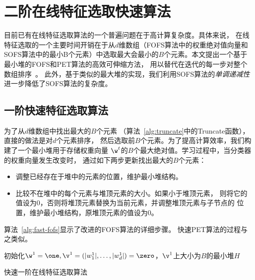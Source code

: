 \section{二阶在线特征选取快速算法}
目前已有在线特征选取算法的一个普遍问题在于高计算复杂度。具体来说，
在线特征选取的一个主要时间开销在于从$d$维数组（FOFS算法中的权重绝对值向量和
SOFS算法中的最小B个元素）中选取最大会最小的$B$个元素。本文提出一个基于
最小堆的FOFS和PET算法的高效可伸缩方法，
用以替代在迭代的每一步对整个数组排序~\cite{wang2014online}。
此外，基于类似的最大堆的实现，我们利用SOFS算法的\emph{单调递减性}
进一步降低了SOFS算法的复杂度。

\subsection{一阶快速特征选取算法}
为了从$d$维数组中找出最大的$B$个元素
（算法~\ref{alg:truncate}中的Truncate函数），直接的做法是对$d$个元素排序，
然后选取前$B$个元素。为了提高计算效率，我们构建了一个最小堆用于存储权重向量
$\w^t$的$B$个最大绝对值。学习过程中，当分类器的权重向量发生改变时，
通过如下两步更新找出最大的$B$个元素：
\begin{itemize}
    \item 调整已经存在于堆中的元素的位置，维护最小堆结构。
    \item 比较不在堆中的每个元素与堆顶元素的大小。如果小于堆顶元素，
        则将它的值设为0，否则将堆顶元素替换为当前元素，并调整堆顶元素与子节点的
        位置，维护最小堆结构，原堆顶元素的值设为0。
\end{itemize}
算法~\ref{alg:fast-fofs}显示了改进的FOFS算法的详细步骤。
快速PET算法的过程与之类似。

\IncMargin{1em}
\begin{algorithm}

\BlankLine
初始化$\w^1=\one, \v^1 = (|w^1_1|,\ldots,|w^1_d|) = \zero$，$\v^1$上大小为$B$的最小堆$H$\;
\caption{快速一阶在线特征选取算法}\label{alg:fast-fofs}
\end{algorithm}\DecMargin{1em}

